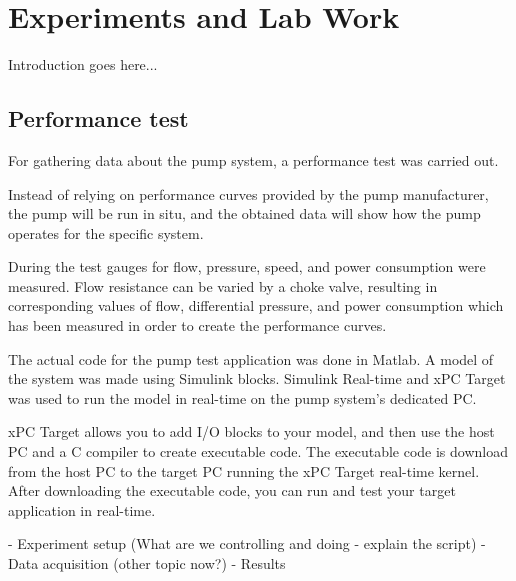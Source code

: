 \chapter{Experiments and Lab Work}\label{ch:experiment}
Introduction goes here... 
 
\section{Performance test}\label{sec:performance_test} 
For gathering data about the pump system, a performance test was carried out.

Instead of relying on performance curves provided by the pump manufacturer,
the pump will be run in situ, and the obtained data will show how the pump 
operates for the specific system.
 
During the test gauges for flow, pressure, speed, and power consumption were 
measured. Flow resistance can be varied by a choke valve, resulting in 
corresponding values of flow, differential pressure, and power consumption 
which has been measured in order to create the performance curves.
 
The actual code for the pump test application was done in Matlab. 
A model of the system was made using Simulink blocks. 
Simulink Real-time and xPC Target was used to run the model in real-time 
on the pump system's dedicated PC. 

xPC Target allows you to add I/O blocks to your model, and then use the host 
PC and a C compiler to create executable code. The executable code is download 
from the host PC to the target PC running the xPC Target real-time kernel. 
After downloading the executable code, you can run and test your target 
application in real-time. 

- Experiment setup (What are we controlling and doing - explain the script)
- Data acquisition (other topic now?)
- Results
 